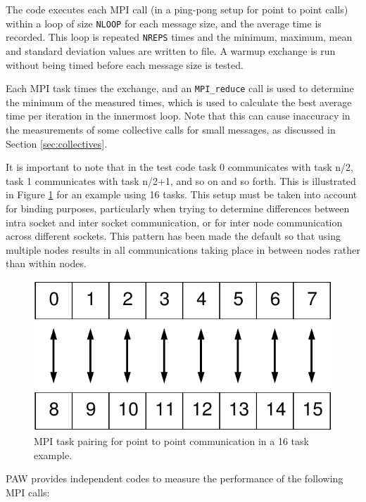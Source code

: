 \documentclass[10pt,a4paper]{report}
\begin{document}
The code executes each MPI call (in a ping-pong setup for point to point calls) within a loop of size \verb+NLOOP+ for each message size, and the average time is recorded. This loop is repeated \verb+NREPS+ times and the minimum, maximum, mean and standard deviation values are written to file. A warmup exchange is run without being timed before each message size is tested.

Each MPI task times the exchange, and an \verb+MPI_reduce+ call is used to determine the minimum of the measured times, which is used to calculate the best average time per iteration in the innermost loop. Note that this can cause inaccuracy in the measurements of some collective calls for small messages, as discussed in Section \ref{sec:collectives}.

It is important to note that in the test code task 0 communicates with task n/2, task 1 communicates with task n/2+1, and so on and so forth. This is illustrated in Figure \ref{fig:mpi_test_config} for an example using 16 tasks. This setup must be taken into account for binding purposes, particularly when trying to determine differences between intra socket and inter socket communication, or for inter node communication across different sockets. This pattern has been made the default so that using multiple nodes results in all communications taking place in between nodes rather than within nodes.

\begin{figure}[ht!]
	\centering
	\includegraphics[width=0.5\columnwidth]{figures/mpi_config.pdf}
	\caption{MPI task pairing for point to point communication in a 16 task example.}
	\label{fig:mpi_test_config}
\end{figure}

PAW provides independent codes to measure the performance of the following MPI calls:
\end{document}
